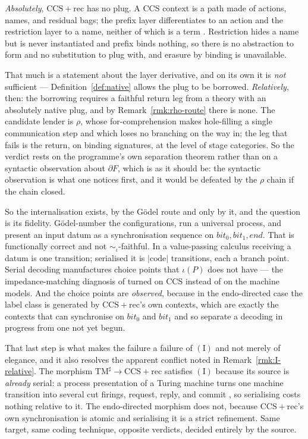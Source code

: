 \documentclass[11pt,a4paper]{article}
\theoremstyle{definition}
\theoremstyle{plain}
\theoremstyle{remark}
\newcommand{\rhoc}{\rho}
\newcommand{\CCSrec}{\mathrm{CCS}{+}\mathrm{rec}}
\newcommand{\Icond}{(\mathrm{I})}
\begin{document}
\emph{Absolutely}, $\CCSrec$ has no plug. A CCS context is a path made of actions, names, and
residual bags; the prefix layer differentiates to an action and the restriction layer to a name,
neither of which is a term \cite[\S2.3]{probe}. Restriction hides a name but is never instantiated
and prefix binds nothing, so there is no abstraction to form and no substitution to plug with, and
erasure by binding is unavailable.

That much is a statement about the layer derivative, and on its own it is \emph{not} sufficient ---
Definition~\ref{def:native} allows the plug to be borrowed. \emph{Relatively}, then: the borrowing
requires a faithful return leg from a theory with an absolutely native plug, and by
Remark~\ref{rmk:rho-route} there is none. The candidate lender is $\rhoc$, whose for-comprehension
makes hole-filling a single communication step and which loses no branching on the way in; the leg
that fails is the return, on binding signatures, at the level of stage categories. So the verdict
rests on the programme's own separation theorem rather than on a syntactic observation about
$\partial F$, which is as it should be: the syntactic observation is what one notices first, and it
would be defeated by the $\rhoc$ chain if the chain closed.

So the internalisation exists, by the Gödel route and only by it, and the question is its fidelity.
Gödel-number the configurations, run a universal process, and present an input datum as a
synchronisation sequence on $\mathit{bit}_0, \mathit{bit}_1, \mathit{end}$. That is functionally
correct and not $\sim_\iota$-faithful. In a value-passing calculus receiving a datum is one
transition; serialised it is $|\mathrm{code}|$ transitions, each a branch point. Serial decoding
manufactures choice points that $\iota(P)$ does not have --- the impedance-matching diagnosis of
\cite[\S2.2]{probe} turned on CCS instead of on the machine models. And the choice points are
\emph{observed}, because in the endo-directed case the label class is generated by $\CCSrec$'s own
contexts, which are exactly the contexts that can synchronise on $\mathit{bit}_0$ and
$\mathit{bit}_1$ and so separate a decoding in progress from one not yet begun.

That last step is what makes the failure a failure of $\Icond$ and not merely of elegance, and it
also resolves the apparent conflict noted in Remark~\ref{rmk:I-relative}. The morphism
$\mathrm{TM}^\sharp \to \CCSrec$ satisfies $\Icond$ because its source is \emph{already} serial: a
process presentation of a Turing machine turns one machine transition into several cut firings,
request, reply, and commit \cite[\S2.2]{probe}, so serialising costs nothing relative to it. The
endo-directed morphism does not, because $\CCSrec$'s own synchronisation is atomic and serialising it
is a strict refinement. Same target, same coding technique, opposite verdicts, decided entirely by
the source.
\end{document}
